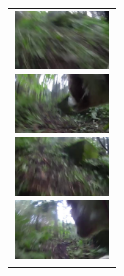 \begin{figure}[H]
    \begin{tabular}{l}


\\ %

      \begin{minipage}{0.165\hsize}
        \begin{center}
          \includegraphics[clip, width=2.5cm]{./Figures/still_run1.eps}
        \end{center}
      \end{minipage}
      \begin{minipage}{0.165\hsize}
        \begin{center}
          \includegraphics[clip, width=2.5cm]{./Figures/still_run2.eps}
        \end{center}
      \end{minipage}
      \begin{minipage}{0.165\hsize}
        \begin{center}
          \includegraphics[clip, width=2.5cm]{./Figures/still_run3.eps}
        \end{center}
      \end{minipage}
      \begin{minipage}{0.165\hsize}
        \begin{center}
          \includegraphics[clip, width=2.5cm]{./Figures/still_run4.eps}
        \end{center}
      \end{minipage}
      \begin{minipage}{0.165\hsize}
        \begin{center}

\end{center}
\end{minipage}
\end{tabular}
\end{figure}
